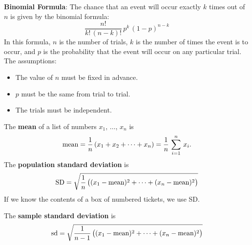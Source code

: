 \documentclass[10pt]{article}
\begin{document}
\textbf{Binomial Formula}:
The chance that an event will occur exactly $k$ times out of $n$ is given by 
the binomial formula:
\[\frac{n!}{k!\,(n-k)!}\,p^k\,(1-p)^{n-k}\]
In this formula, $n$ is the number of trials, $k$ is the number of times
the event is to occur, and $p$ is the probability that the event will occur
on any particular trial.    The assumptions:
\begin{itemize}
\item The value of $n$ must be fixed in advance.
\item $p$ must be the same from trial to trial.
\item The trials must be independent.
\end{itemize}

The \textbf{mean} of a list of numbers $x_1$, $\dots$, $x_n$ is\vspace{-4pt}
\[\mbox{mean} = \frac{1}{n}\,(x_1 + x_2 + \cdots + x_n) = \frac{1}{n}\,\sum_{i=1}^n\,x_i.\vspace{-4pt}\]
The \textbf{population standard deviation} is\vspace{-4pt}
\[\mbox{SD} = \sqrt{\frac{1}{n}\,\big((x_1-\mbox{mean})^2 + \cdots + (x_n - \mbox{mean})^2\big)}\vspace{-4pt}\]
If we know the contents of a box of numbered tickets, we use SD.

The \textbf{sample standard deviation} is\vspace{-4pt}
\[\mbox{sd} = \sqrt{\frac{1}{n-1}\,\big((x_1-\mbox{mean})^2 + \cdots + (x_n - \mbox{mean})^2\big)}\vspace{-4pt}\]
\end{document}
